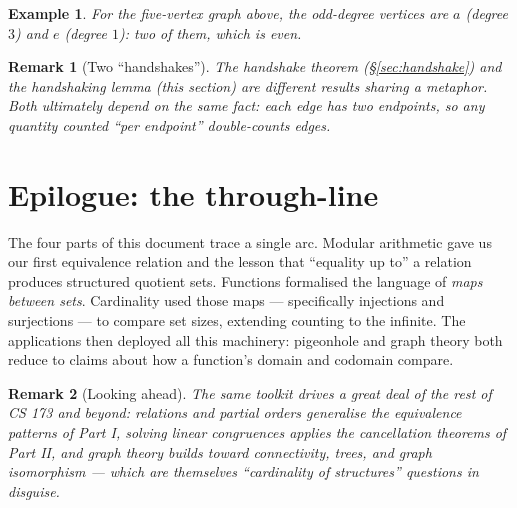 \documentclass[11pt]{article}
\theoremstyle{defstyle}
\theoremstyle{thmstyle}
\theoremstyle{notstyle}
\newtheorem*{remark}{Remark}
\newtheorem*{example}{Example}
\theoremstyle{cautionstyle}
\begin{document}
\begin{notebox}
\begin{example}
For the five-vertex graph above, the odd-degree vertices are $a$ (degree $3$)
and $e$ (degree $1$): two of them, which is even.  \checkmark
\end{example}
\end{notebox}

\begin{notebox}
\begin{remark}[Two ``handshakes'']
The \emph{handshake theorem} (\S\ref{sec:handshake}) and the
\emph{handshaking lemma} (this section) are different results sharing a
metaphor.  Both ultimately depend on the same fact: each edge has two
endpoints, so any quantity counted ``per endpoint'' double-counts edges.
\end{remark}
\end{notebox}

\newpage
\section*{Epilogue: the through-line}

The four parts of this document trace a single arc.  Modular arithmetic
gave us our first equivalence relation and the lesson that ``equality up
to'' a relation produces structured quotient sets.  Functions formalised
the language of \emph{maps between sets}.  Cardinality used those maps
--- specifically injections and surjections --- to compare set sizes,
extending counting to the infinite. The applications then deployed all
this machinery: pigeonhole and graph theory both reduce to claims about
how a function's domain and codomain compare.

\begin{notebox}
\begin{remark}[Looking ahead]
The same toolkit drives a great deal of the rest of CS 173 and beyond:
relations and partial orders generalise the equivalence patterns of
Part I, solving linear congruences applies the cancellation theorems of
Part II, and graph theory builds toward connectivity, trees, and graph
isomorphism --- which are themselves ``cardinality of structures'' questions
in disguise.
\end{remark}
\end{notebox}
\end{document}
